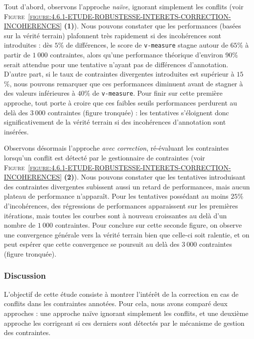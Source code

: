 			Tout d'abord, observons l'approche \textit{naïve}, ignorant simplement les conflits (voir \textsc{Figure~\ref{figure:4.6.1-ETUDE-ROBUSTESSE-INTERETS-CORRECTION-INCOHERENCES}} \textbf{(1)}).
			Nous pouvons constater que les performances (basées sur la vérité terrain) plafonnent très rapidement si des incohérences sont introduites : dès $5$\% de différences, le score de \texttt{v-measure} stagne autour de $65$\% à partir de $1~000$ contraintes, alors qu'une performance théorique d'environ $90$\% serait attendue pour une tentative n'ayant pas de différences d'annotation.
			D'autre part, si le taux de contraintes divergentes introduites est supérieur à $15$\%, nous pouvons remarquer que ces performances diminuent avant de stagner à des valeurs inférieures à $40$\% de \texttt{v-measure}.
			Pour finir sur cette première approche, tout porte à croire que ces faibles seuils performances perdurent au delà des $3~000$ contraintes (figure tronquée) : les tentatives s'éloignent donc significativement de la vérité terrain si des incohérences d'annotation sont insérées.
			
			
			Observons désormais l'approche \textit{avec correction}, ré-évaluant les contraintes lorsqu'un conflit est détecté par le gestionnaire de contraintes (voir \textsc{Figure~\ref{figure:4.6.1-ETUDE-ROBUSTESSE-INTERETS-CORRECTION-INCOHERENCES}} \textbf{(2)}).
			Nous pouvons constater que les tentatives introduisant des contraintes divergentes subissent aussi un retard de performances, mais aucun plateau de performance n'apparaît.
			Pour les tentatives possédant au moins $25$\% d'incohérences, des régressions de performances apparaissent sur les premières itérations, mais toutes les courbes sont à nouveau croissantes au delà d'un nombre de $1~000$ contraintes.
			Pour conclure sur cette seconde figure, on observe une convergence générale vers la vérité terrain bien que celle-ci soit ralentie, et on peut espérer que cette convergence se poursuit au delà des $3~000$ contraintes (figure tronquée).

		\subsubsection{Discussion}
		
			L'objectif de cette étude consiste à montrer l'intérêt de la correction en cas de conflits dans les contraintes annotées.
			Pour cela, nous avons comparé deux approches : une approche naïve ignorant simplement les conflits, et une deuxième approche les corrigeant si ces derniers sont détectés par le mécanisme de gestion des contraintes.
		
